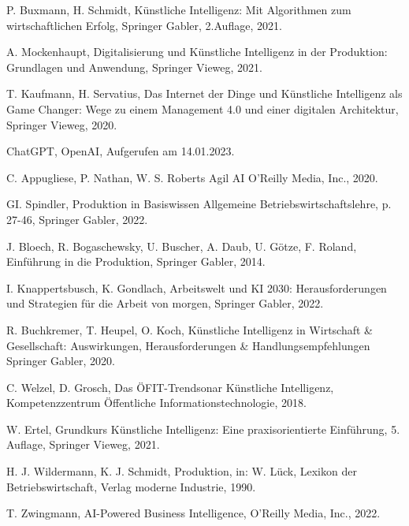 

\clearpage
{}



\begin{thebibliography}{99}

	P. Buxmann, H. Schmidt,
	Künstliche Intelligenz: Mit Algorithmen zum wirtschaftlichen Erfolg,
	Springer Gabler,
	2.Auflage,
	2021.
	
	A. Mockenhaupt,
	Digitalisierung und Künstliche Intelligenz in der Produktion: Grundlagen und Anwendung,
	Springer Vieweg,
	2021.

	T. Kaufmann, H. Servatius,
	Das Internet der Dinge und Künstliche Intelligenz als Game Changer: Wege zu einem Management 4.0 und einer digitalen Architektur,
	Springer Vieweg,
	2020.

	ChatGPT,
	OpenAI,
	Aufgerufen am 14.01.2023.

	C. Appugliese, P. Nathan, W. S. Roberts
	Agil AI
	O'Reilly Media, Inc.,
	2020.

	GI. Spindler,
	Produktion in Basiswissen Allgemeine Betriebswirtschaftslehre,
	p. 27-46,
	Springer Gabler,
	2022.

	J. Bloech, R. Bogaschewsky, U. Buscher, A. Daub, U. Götze, F. Roland,
	Einführung in die Produktion,
	Springer Gabler, 
	2014.
	
	I. Knappertsbusch, K. Gondlach,
	Arbeitswelt und KI 2030: Herausforderungen und Strategien für die Arbeit von morgen,
	Springer Gabler,
	2022.

	R. Buchkremer, T. Heupel, O. Koch,
	Künstliche Intelligenz in Wirtschaft \& Gesellschaft: Auswirkungen, Herausforderungen \& Handlungsempfehlungen
	Springer Gabler,
	2020.

	C. Welzel, D. Grosch,
	Das ÖFIT-Trendsonar Künstliche Intelligenz,
	Kompetenzzentrum Öffentliche Informationstechnologie,
	2018.

	W. Ertel,
	Grundkurs Künstliche Intelligenz: Eine praxisorientierte Einführung,
	5. Auflage,
	Springer Vieweg,
	2021.

	H. J. Wildermann, K. J. Schmidt,
	Produktion, 
	in: W. Lück, Lexikon der Betriebswirtschaft,
	Verlag moderne Industrie,
	1990.


	T. Zwingmann,
	AI-Powered Business Intelligence,
	O'Reilly Media, Inc.,
	2022.


\end{thebibliography}
